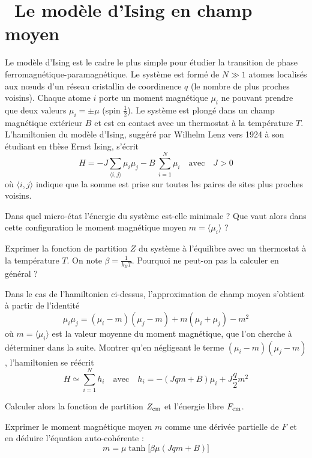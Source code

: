 \documentclass[utf8, 11pt]{feuille}
\begin{document}




\section{\medium~Le modèle d'Ising en champ moyen}

Le modèle d'Ising est le cadre le plus simple pour étudier la transition de phase ferromagnétique-paramagnétique. Le système est formé de $N \gg 1$ atomes localisés aux n\oe uds d'un réseau cristallin de coordinence $q$ (le nombre de plus proches voisins). Chaque atome $i$ porte un moment magnétique $\mu_i$ ne pouvant prendre que deux valeurs $\mu_i= \pm \mu$ (spin $\frac{1}{2}$). Le système est plongé dans un champ magnétique extérieur $B$ et est en contact avec un thermostat à la température $T$. L'hamiltonien du modèle d'Ising, suggéré par Wilhelm Lenz vers 1924 à son étudiant en thèse Ernst Ising, s'écrit
$$
H=-J\sum_{\langle i,j \rangle}\mu_i \mu_j -B\ \sum_{i=1}^N \mu_i \quad \textrm{avec} \quad J>0
$$
où ${\langle i,j\rangle}$ indique que la somme est prise sur toutes les paires de sites plus proches voisins.

\medskip

\question
Dans quel micro-état l'énergie du système est-elle minimale ? Que vaut alors dans cette configuration le moment magnétique moyen $m=\langle \mu_i \rangle$ ?

\question
Exprimer la fonction de partition $Z$ du système à l'équilibre avec un thermostat à la température $T$. On note $\beta=\frac{1}{k_B T}$. Pourquoi ne peut-on pas la calculer en général ?

\question
Dans le cas de l'hamiltonien ci-dessus, l'approximation de champ moyen s'obtient à partir de l'identité
$$
\mu_i\mu_j = (\mu_i -m)(\mu_j -m)+ m(\mu_i+\mu_j)-m^2
$$
où $m=\langle \mu_i \rangle$ est la valeur moyenne du moment magnétique, que l'on cherche à déterminer dans la suite.  Montrer qu'en négligeant le terme $(\mu_i -m)(\mu_j -m)$, l'hamiltonien se réécrit 
$$
H \simeq \sum_{i=1}^N h_i \quad \textrm{avec} \quad h_i= -(Jqm+B) \mu_i
+J\frac{q}{2} m^2
$$

\question
Calculer alors la fonction de partition $Z_{\rm cm}$ et l'énergie libre $F_{\rm cm}$.

\question
Exprimer le moment magnétique moyen $m$ comme une dérivée partielle de $F$ et en déduire l'équation auto-cohérente :
\begin{equation} \label{eqAutoIsing}
m=\mu \tanh  \big[ \beta \mu(J q m +B) \big]
\end{equation}
\end{document}
